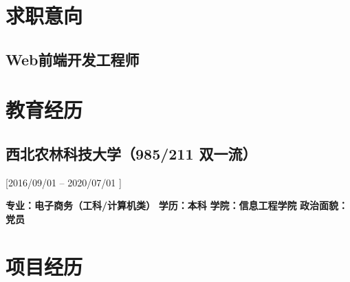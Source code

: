 \documentclass{mycv}
\begin{document}
\maketitle%

\section{求职意向}

\subsection{Web前端开发工程师}

\section{教育经历}
\subsection{西北农林科技大学（985/211 双一流）}[2016/09/01 – 2020/07/01 ]

\textbf{专业：电子商务（工科/计算机类）}  \hspace{1.5em}   \textbf{学历：本科}  \hspace{1.5em}   \textbf{学院：信息工程学院}   \hspace{1.5em}  \textbf{政治面貌：党员}


\section{项目经历}
\end{document}
